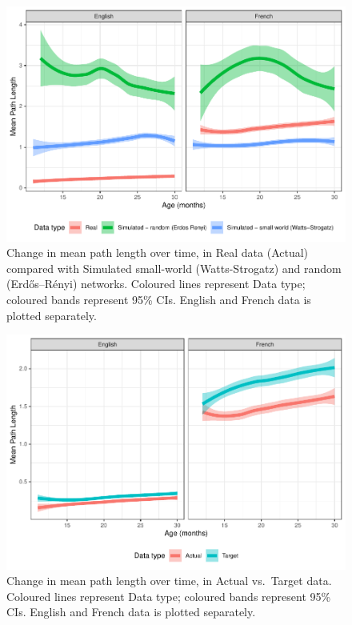 \documentclass[
  man,floatsintext]{apa6}
\begin{document}
\begin{figure}
\centering
\includegraphics{NetworkGraphs_supplementary-data_files/figure-latex/Figure-path-length-age-1.pdf}
\caption{\label{fig:Figure-path-length-age}Change in mean path length over time, in Real data (Actual) compared with Simulated small-world (Watts-Strogatz) and random (Erdős--Rényi) networks. Coloured lines represent Data type; coloured bands represent 95\% CIs. English and French data is plotted separately.}
\end{figure}

\begin{figure}
\centering
\includegraphics{NetworkGraphs_supplementary-data_files/figure-latex/Figure-path-length-DT-age-1.pdf}
\caption{\label{fig:Figure-path-length-DT-age}Change in mean path length over time, in Actual vs.~Target data. Coloured lines represent Data type; coloured bands represent 95\% CIs. English and French data is plotted separately.}
\end{figure}
\end{document}
